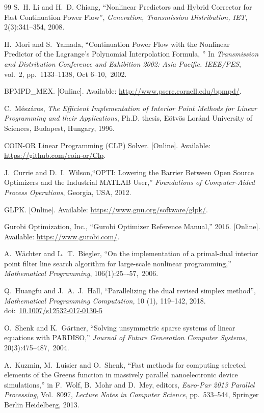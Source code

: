 \documentclass[12pt]{article}
\numberwithin{equation}{section}
\numberwithin{table}{section}
\numberwithin{figure}{section}
\begin{document}
\begin{thebibliography}{99}
S.~H. Li and H.~D. Chiang, ``Nonlinear Predictors and Hybrid Corrector for Fast Continuation Power Flow'', {\em Generation, Transmission Distribution, IET}, 2(3):341--354, 2008.

H.~Mori and S.~Yamada, ``Continuation Power Flow with the Nonlinear Predictor of the Lagrange's Polynomial Interpolation Formula, '' In {\em Transmission and Distribution Conference and Exhibition 2002:
  Asia Pacific. IEEE/PES}, vol.~2, pp.~1133--1138, Oct 6--10,~2002.

BPMPD\_MEX. [Online]. Available:
  \url{http://www.pserc.cornell.edu/bpmpd/}.

C.~M{\'e}sz{\'a}ros, \emph{The Efficient Implementation of Interior Point Methods for Linear Programming and their Applications}, Ph.D. thesis,
  E{\"o}tv{\"o}s Lor{\'a}nd University of Sciences, Budapest, Hungary, 1996.

COIN-OR Linear Programming (CLP) Solver. [Online]. Available:
  \url{https://github.com/coin-or/Clp}.

J.~Currie and D.~I.~Wilson,``OPTI: Lowering the Barrier Between Open Source Optimizers and the Industrial MATLAB User,'' \emph{Foundations of Computer-Aided Process Operations}, Georgia, USA, 2012.

GLPK. [Online]. Available:
  \url{https://www.gnu.org/software/glpk/}.

Gurobi Optimization, Inc., ``Gurobi Optimizer Reference Manual,'' 2016. [Online]. Available:
  \url{https://www.gurobi.com/}.

A.~W\"achter and L.~T.~Biegler, ``On the implementation of a primal-dual interior point filter line search algorithm for large-scale nonlinear programming,'' \emph{Mathematical Programming}, 106(1):25–-57,~2006.

Q.~Huangfu and J.~A.~J.~Hall, ``Parallelizing the dual revised simplex method'', \emph{Mathematical Programming Computation}, 10 (1), 119--142, 2018. doi:~\href{https://doi.org/10.1007/s12532-017-0130-5}{10.1007/s12532-017-0130-5}

O.~Shenk and K.~G\"artner, ``Solving unsymmetric sparse systems of linear equations with PARDISO,'' \emph{Journal of Future Generation Computer Systems}, 20(3):475--487,~2004.

A.~Kuzmin, M.~Luisier and O.~Shenk, ``Fast methods for computing selected elements of the Greens function in massively parallel nanoelectronic device simulations,'' in F.~Wolf, B.~Mohr and D.~Mey, editors, \emph{Euro-Par 2013 Parallel Processing}, Vol.~8097, \emph{Lecture Notes in Computer Science}, pp.~533--544, Springer Berlin Heidelberg, 2013.


\end{thebibliography}
\end{document}
